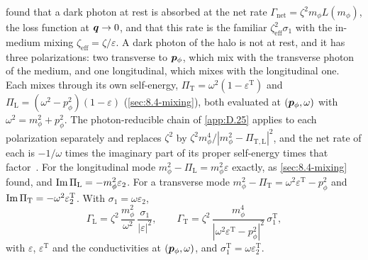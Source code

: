  found that a dark photon at rest is absorbed at the net rate $\varGamma_{\mathrm{net}} = \zeta^2m_\phi L(m_\phi)$, the loss function at $\bm{q} \to 0$, and that this rate is the familiar $\zeta_{\mathrm{eff}}^2\sigma_1$ with the in-medium mixing $\zeta_{\mathrm{eff}} = \zeta/\varepsilon$. A dark photon of the halo is not at rest, and it has three polarizations: two transverse to $\bm{p}_\phi$, which mix with the transverse photon of the medium, and one longitudinal, which mixes with the longitudinal one. Each mixes through its own self-energy, $\Pi_{\mathrm{T}} = \omega^2(1 - \varepsilon^{\mathrm{T}})$ and $\Pi_{\mathrm{L}} = (\omega^2 - p_\phi^2)(1 - \varepsilon)$ (\cref{sec:8.4-mixing}), both evaluated at $(\bm{p}_\phi, \omega)$ with $\omega^2 = m_\phi^2 + p_\phi^2$. The photon-reducible chain of \cref{app:D.25} applies to each polarization separately and replaces $\zeta^2$ by $\zeta^2m_\phi^4/|m_\phi^2 - \Pi_{\mathrm{T,L}}|^2$, and the net rate of each is $-1/\omega$ times the imaginary part of its proper self-energy times that factor~\cites[Eqs.~(2) and (18)]{an2015direct}[Eqs.~(38)--(40)]{mitridate2021dark}. For the longitudinal mode $m_\phi^2 - \Pi_{\mathrm{L}} = m_\phi^2\varepsilon$ exactly, as \cref{sec:8.4-mixing} found, and $\operatorname{Im}\Pi_{\mathrm{L}} = -m_\phi^2\varepsilon_2$. For a transverse mode $m_\phi^2 - \Pi_{\mathrm{T}} = \omega^2\varepsilon^{\mathrm{T}} - p_\phi^2$ and $\operatorname{Im}\Pi_{\mathrm{T}} = -\omega^2\varepsilon_2^{\mathrm{T}}$. With $\sigma_1 = \omega\varepsilon_2$,
\begin{equation}
  \varGamma_{\mathrm{L}} = \zeta^2\,\frac{m_\phi^2}{\omega^2}\,\frac{\sigma_1}{|\varepsilon|^2} , \qquad
  \varGamma_{\mathrm{T}} = \zeta^2\,\frac{m_\phi^4}{|\omega^2\varepsilon^{\mathrm{T}} - p_\phi^2|^2}\,\sigma_1^{\mathrm{T}} ,
  \label{eq:10.7-TL}
\end{equation}
with $\varepsilon$, $\varepsilon^{\mathrm{T}}$ and the conductivities at $(\bm{p}_\phi, \omega)$, and $\sigma_1^{\mathrm{T}} = \omega\varepsilon_2^{\mathrm{T}}$.

